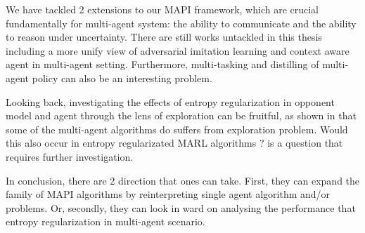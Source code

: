 \label{sec:chap6-future-work}
We have tackled 2 extensions to our MAPI framework, which are crucial fundamentally for multi-agent system: the ability to communicate and the ability to reason under uncertainty. There are still works untackled in this thesis including a more unify view of adversarial imitation learning and context aware agent in multi-agent setting. Furthermore, multi-tasking and distilling of multi-agent policy can also be an interesting problem. 

Looking back, investigating the effects of entropy regularization in opponent model and agent through the lens of exploration can be fruitful, as shown in \cite{mahajan2019maven} that some of the multi-agent algorithms do suffers from exploration problem. Would this also occur in entropy regularizated MARL algorithms ? is a question that requires further investigation.

In conclusion, there are 2 direction that ones can take. First, they can expand the family of MAPI algorithms by reinterpreting single agent algorithm and/or problems. Or, secondly, they can look in ward on analysing the performance that entropy regularization in multi-agent scenario. 